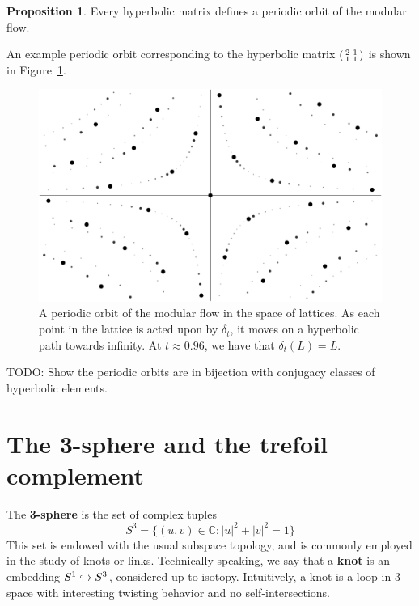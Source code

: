\documentclass[12pt,twoside]{reedthesis}
\theoremstyle{definition}
\newtheorem{prop}[thm]{Proposition}
\newcommand{\C}{\mathbb{C}}
\newcommand{\into}{\xhookrightarrow{}}
\newcommand{\TODO}[1]{{\color{todopink}\textsf{TODO: #1}}}
\newcommand{\defnphrase}[1]{\textbf{#1}}
\begin{document}
\begin{prop}\label{prop:hyperbolic_defines_flow}
  Every hyperbolic matrix defines a periodic orbit of the modular flow.
\end{prop}

An example periodic orbit corresponding to the hyperbolic matrix $\begin{psmallmatrix} 2 & 1 \\ 1 & 1 \end{psmallmatrix}$ is shown in Figure~\ref{fig:periodic_orbits_lattice}.

\begin{figure}[h]
  \centering
  \includegraphics[width=0.8\linewidth]{figures/periodic_orbits_lattice.pdf}
  \caption{A periodic orbit of the modular flow in the space of lattices. As each point in the lattice is acted upon by $\delta_t$, it moves on a hyperbolic path towards infinity. At $t \approx 0.96$, we have that $\delta_t(L) = L$.}
  \label{fig:periodic_orbits_lattice}
\end{figure}

\TODO{Show the periodic orbits are in bijection with conjugacy classes of hyperbolic elements.}

\chapter{The 3-sphere and the trefoil complement}\label{sec:three_sphere}

The \defnphrase{3-sphere} is the set of complex tuples
\begin{equation*}
  S^3 = \{ (u, v) \in \C : |u|^2 + |v|^2 = 1 \}
\end{equation*}
This set is endowed with the usual subspace topology, and is commonly employed in the study of knots or links.
Technically speaking, we say that a \defnphrase{knot} is an embedding $S^1 \into S^3$, considered up to isotopy.
Intuitively, a knot is a loop in 3-space with interesting twisting behavior and no self-intersections.
\end{document}
